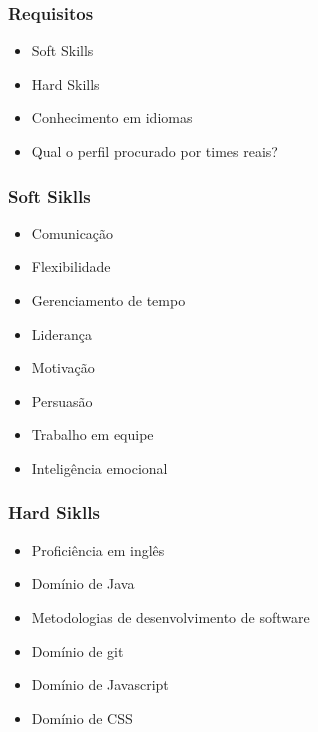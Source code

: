 \documentclass[    
  12pt, 
  compress,
  aspectratio=169,
  blue
  ]{beamer}
\begin{document}
\begin{frame}
\frametitle{ Requisitos}   

\begin{itemize}
\item<1-> Soft Skills
\item<2-> Hard Skills  
\item<3-> Conhecimento em idiomas
\item<4-> Qual o perfil procurado por times reais?
\end{itemize}

\end{frame}

\begin{frame}
\frametitle{ Soft Siklls}   

\begin{itemize}
\item<1-> Comunicação
\item<2-> Flexibilidade
\item<3-> Gerenciamento de tempo
\item<4-> Liderança
\item<5-> Motivação
\item<6-> Persuasão
\item<6-> Trabalho em equipe
\item<6-> Inteligência emocional
\end{itemize}

\end{frame}
\begin{frame}
\frametitle{ Hard Siklls}   

\begin{itemize}
\item<1-> Proficiência em inglês
\item<2-> Domínio de Java
\item<3-> Metodologias de desenvolvimento de software
\item<4-> Domínio de git
\item<5-> Domínio de Javascript
\item<6-> Domínio de CSS
\end{itemize}

\end{frame}
\end{document}
